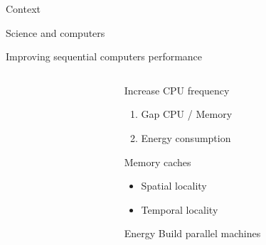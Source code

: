 \documentclass[xcolor={usenames,dvipsnames},hyperref={pdfusetitle}]{beamer}
\begin{document}
\begin{section}{Context}

\begin{frame}{Science and computers}
    
\end{frame}

\begin{frame}{Improving sequential computers performance}
    \begin{columns}
        \begin{column}{.45\textwidth}
            \centering
            
            \begin{block}{}
                \centering
            \end{block}
        \end{column}
        \begin{column}{.45\textwidth}
            \pause
            \begin{block}{Increase CPU frequency}
                \begin{enumerate}
                    \item<alert@1-> Gap CPU / Memory
                    \item<alert@1-> Energy consumption
                \end{enumerate}
            \end{block}
            \pause
            \begin{exampleblock}{Memory caches}
                \begin{itemize}
                    \item Spatial locality
                    \item Temporal locality
                \end{itemize}
            \end{exampleblock}
            \pause
            \begin{exampleblock}{Energy}
                Build parallel machines
            \end{exampleblock}
        \end{column}
    \end{columns}
\end{frame}


\end{section}
\end{document}
